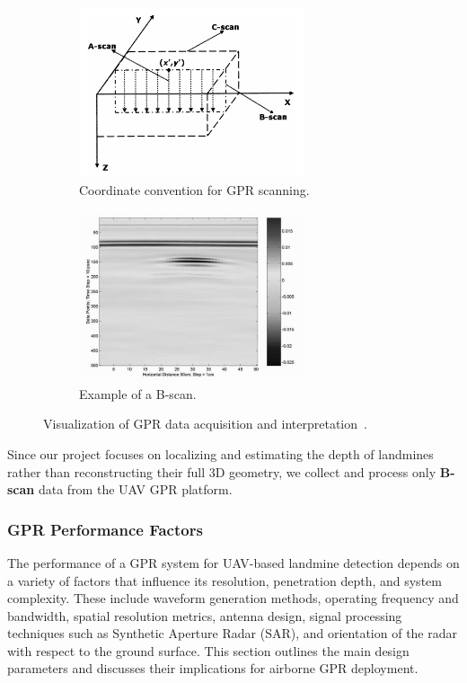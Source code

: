 \begin{figure}[h!]
    \centering
    \begin{subfigure}[b]{0.48\linewidth}
        \centering
        \includegraphics[height=5cm]{figs/Huirui/gpr_coords.png}
        \caption{Coordinate convention for GPR scanning.}
        \label{fig:gpr_coords}
    \end{subfigure}
    \hfill
    \begin{subfigure}[b]{0.48\linewidth}
        \centering
        \includegraphics[height=5cm]{figs/Huirui/gpr_bscan.png}
        \caption{Example of a B-scan.}
        \label{fig:gpr_bscan}
    \end{subfigure}
    \caption{Visualization of GPR data acquisition and interpretation~\cite{paik2002image}.}
\end{figure}

Since our project focuses on localizing and estimating the depth of landmines rather than reconstructing their full 3D geometry, we collect and process only \textbf{B-scan} data from the UAV GPR platform.




\subsubsection{GPR Performance Factors}\label{GPR_Factors}

The performance of a GPR system for UAV-based landmine detection depends on a variety of factors that influence its resolution, penetration depth, and system complexity. These include waveform generation methods, operating frequency and bandwidth, spatial resolution metrics, antenna design, signal processing techniques such as Synthetic Aperture Radar (SAR), and orientation of the radar with respect to the ground surface. This section outlines the main design parameters and discusses their implications for airborne GPR deployment.


